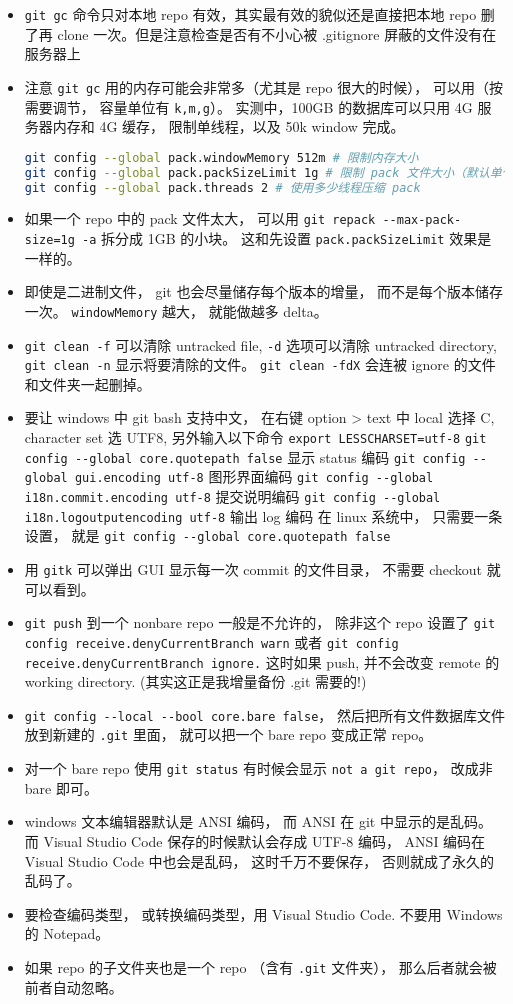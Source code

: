 \begin{itemize}
\item \verb|git gc| 命令只对本地 repo 有效，其实最有效的貌似还是直接把本地 repo 删了再 clone 一次。但是注意检查是否有不小心被 .gitignore 屏蔽的文件没有在服务器上
\item 注意 \verb|git gc| 用的内存可能会非常多（尤其是 repo 很大的时候）， 可以用（按需要调节， 容量单位有 \verb|k,m,g|）。 实测中，100GB 的数据库可以只用 4G 服务器内存和 4G 缓存， 限制单线程，以及 50k window 完成。
\begin{lstlisting}[language=bash]
git config --global pack.windowMemory 512m # 限制内存大小
git config --global pack.packSizeLimit 1g # 限制 pack 文件大小（默认单个文件）
git config --global pack.threads 2 # 使用多少线程压缩 pack
\end{lstlisting}
\item 如果一个 repo 中的 pack 文件太大， 可以用 \verb|git repack --max-pack-size=1g -a| 拆分成 1GB 的小块。 这和先设置 \verb|pack.packSizeLimit| 效果是一样的。
\item 即使是二进制文件， git 也会尽量储存每个版本的增量， 而不是每个版本储存一次。 \verb|windowMemory| 越大， 就能做越多 delta。
\item \verb|git clean -f| 可以清除 untracked file, \verb|-d| 选项可以清除 untracked directory,  \verb|git clean -n| 显示将要清除的文件。 \verb|git clean -fdX| 会连被 ignore 的文件和文件夹一起删掉。
\item 要让 windows 中 git bash 支持中文， 在右键 option > text 中 local 选择 C, character set 选 UTF8, 另外输入以下命令
\verb|export LESSCHARSET=utf-8|
\verb|git config --global core.quotepath false|     显示 status 编码
\verb|git config --global gui.encoding utf-8|    图形界面编码
\verb|git config --global i18n.commit.encoding utf-8|   提交说明编码
\verb|git config --global i18n.logoutputencoding utf-8| 输出 log 编码
在 linux 系统中， 只需要一条设置， 就是
\verb|git config --global core.quotepath false|
\item 用 \verb|gitk| 可以弹出 GUI 显示每一次 commit 的文件目录， 不需要 checkout 就可以看到。
\item \verb|git push| 到一个 nonbare repo 一般是不允许的， 除非这个 repo 设置了 \verb|git config receive.denyCurrentBranch warn| 或者 \verb|git config receive.denyCurrentBranch ignore.| 这时如果 push, 并不会改变 remote 的 working directory. (其实这正是我增量备份 .git 需要的!)
\item \verb|git config --local --bool core.bare false|， 然后把所有文件数据库文件放到新建的 \verb|.git| 里面， 就可以把一个 bare repo 变成正常 repo。
\item 对一个 bare repo 使用 \verb|git status| 有时候会显示 \verb|not a git repo|， 改成非 bare 即可。
\item windows 文本编辑器默认是 ANSI 编码， 而 ANSI 在 git 中显示的是乱码。 而 Visual Studio Code 保存的时候默认会存成 UTF-8 编码， ANSI 编码在 Visual Studio Code 中也会是乱码， 这时千万不要保存， 否则就成了永久的乱码了。
\item 要检查编码类型， 或转换编码类型，用 Visual Studio Code.  不要用 Windows 的 Notepad。
\item 如果 repo 的子文件夹也是一个 repo （含有 \verb|.git| 文件夹）， 那么后者就会被前者自动忽略。
\end{itemize}


